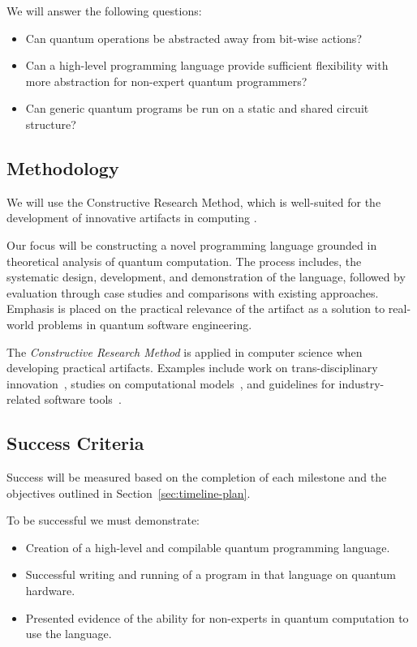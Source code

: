 \documentclass[journal,onecolumn, compsoc]{IEEEtran}
\begin{document}
We will answer the following questions:
\begin{itemize}
    \item Can quantum operations be abstracted away from bit-wise actions?
    \item Can a high-level programming language provide sufficient flexibility with more abstraction for non-expert quantum programmers?
    \item Can generic quantum programs be run on a static and shared circuit structure?
\end{itemize}

\subsection{Methodology}
We will use the Constructive Research Method, which is well-suited for the development of innovative artifacts in computing \cite{lukka2003constructive}. 

Our focus will be constructing a novel programming language grounded in theoretical analysis of quantum computation. 
The process includes, the systematic design, development, and demonstration of the language, followed by evaluation through case studies and comparisons with existing approaches. 
Emphasis is placed on the practical relevance of the artifact as a solution to real-world problems in quantum software engineering.

The \textit{Constructive Research Method} is applied in computer science when developing practical artifacts. Examples include work on trans-disciplinary innovation~\cite{mcgregor2018}, studies on computational models~\cite{dodig2010}, and guidelines for industry-related software tools~\cite{lassenius2001}.

\subsection{Success Criteria}
Success will be measured based on the completion of each milestone and the objectives outlined in Section~\ref{sec:timeline-plan}.

To be successful we must demonstrate:
\begin{itemize}
    \item Creation of a high-level and compilable quantum programming language.
    \item Successful writing and running of a program in that language on quantum hardware.
    \item Presented evidence of the ability for non-experts in quantum computation to use the language.
\end{itemize}
\end{document}

